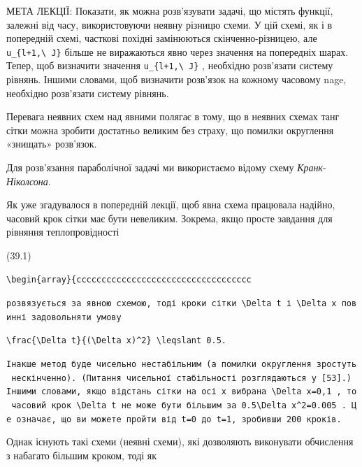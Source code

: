 \documentclass[
  ukrainian,
]{article}
\begin{document}
МЕТА ЛЕКЦІЇ: Показати, як можна розв'язувати задачі, що містять функції,
залежні від часу, використовуючи неявну різницю схеми. У цій схемі, як і
в попередній схемі, часткові похідні замінюються скінченно-різницею, але
\texttt{u\_\{l+1,\textbackslash{}\ J\}} більше не виражаються явно через
значення на попередніх шарах. Тепер, щоб визначити значення
\texttt{u\_\{l+1,\textbackslash{}\ J\}} , необхідно розв'язати систему
рівнянь. Іншими словами, щоб визначити розв'язок на кожному часовому
nage, необхідно розв'язати систему рівнянь.

Перевага неявних схем над явними полягає в тому, що в неявних схемах
танг сітки можна зробити достатньо великим без страху, що помилки
округлення «знищать» розв'язок.

Для розв'язання параболічної задачі ми використаємо відому схему
\emph{Кранк}-\emph{Ніколсона}.

Як уже згадувалося в попередній лекції, щоб явна схема працювала
надійно, часовий крок сітки має бути невеликим. Зокрема, якщо просте
завдання для рівняння теплопровідності

(39.1)

\begin{verbatim}
\begin{array}{ccccccccccccccccccccccccccccccccccc
\end{verbatim}

\texttt{розв\textquotesingle{}язується\ за\ явною\ схемою,\ тоді\ кроки\ сітки\ \textquotesingle{}\textbackslash{}Delta\ t\textquotesingle{}\ і\ \textquotesingle{}\textbackslash{}Delta\ x\textquotesingle{}\ повинні\ задовольняти\ умову}

\begin{verbatim}
\frac{\Delta t}{(\Delta x)^2} \leqslant 0.5.
\end{verbatim}

\texttt{Інакше\ метод\ буде\ чисельно\ нестабільним\ (а\ помилки\ округлення\ зростуть\ нескінченно).\ (Питання\ чисельної\ стабільності\ розглядаються\ у\ {[}53{]}.)\ Іншими\ словами,\ якщо\ відстань\ сітки\ на\ осі\ x\ вибрана\ \textquotesingle{}\textbackslash{}Delta\ x=0,1\textquotesingle{}\ ,\ то\ часовий\ крок\ \textquotesingle{}\textbackslash{}Delta\ t\textquotesingle{}\ не\ може\ бути\ більшим\ за\ \textquotesingle{}0.5\textbackslash{}Delta\ x\^{}2=0.005\textquotesingle{}\ .\ Це\ означає,\ що\ ви\ можете\ пройти\ від\ t=0\ до\ t=1,\ зробивши\ 200\ кроків.}

Однак існують такі схеми (неявні схеми), які дозволяють виконувати
обчислення з набагато більшим кроком, тоді як
\end{document}
